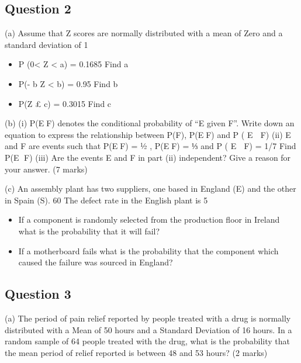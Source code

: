 \begin{itemize}

\subsection{Question 2}

(a)	
Assume that Z scores are normally distributed with a mean of Zero and a
 	standard deviation of 1
 
\begin{itemize} 
\item[(i)] 	P (0< Z < a)  =  0.1685 			 Find   a 
\item[(ii)]            P(- b \leq Z < b) =  0.95		            	 Find   b
\item[(iii)]             P(Z £ c)  =       0.3015 			 Find   c
\end{itemize}
 

(b) 	(i) P(EF) denotes the conditional probability of “E given F”. 
		Write down an equation to express the relationship between 
		P(F), P(EF) and P ( E  F)
	(ii) E and F are events such that   P(EF) = ½ ,   P(EF) =  ⅓ 
	      and P ( E  F) = 1/7
Find P(E F)
(iii) Are the events E and F in part (ii) independent? Give a reason for your answer.										(7 marks)	


(c)	An assembly plant has two suppliers, one based in England (E) and the other in Spain (S).  
60%
The defect rate in the English plant is 5%

\begin{itemize}
\item[(i)]	If a component is randomly selected from the production floor in Ireland what is the probability that it will fail?
\item[(ii)]	If a motherboard fails what is the probability that the component which caused the failure was sourced in England?
\end{itemize}


\subsection{Question 3}
(a) 	The period of pain relief reported by people treated with a drug is normally distributed with a Mean of 50 hours and a Standard Deviation of 16 hours.  In a random sample of 64 people treated with the drug, what is the probability that the mean period of relief reported is between 48 and 53 hours?
											(2 marks)


\end{itemize}
